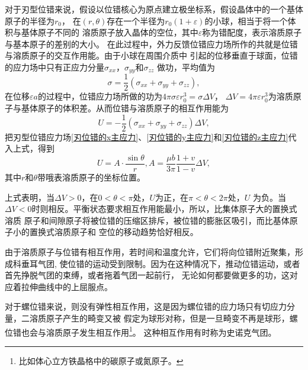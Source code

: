                     对于刃型位错来说，假设以位错核心为原点建立极坐标系，假设晶体中的一个基体原子的半径为$r_0$，
                    在$(r,\theta)$存在一个半径为$r_0(1+\varepsilon)$的小球，相当于将一个体积与基体原子不同的
                    溶质原子放入晶体的空位，其中$\varepsilon$称为错配度，表示溶质原子与基本原子的差别的大小。
                    在此过程中，外力反馈位错应力场所作的共就是位错与溶质原子的交互作用能。由于小球在周围介质中
                    引起的位移垂直于球面，位错的应力场中只有正应力分量$\sigma_{xx}$，$\sigma_{yy}$和$\sigma_{zz}$
                    做功，平均值为
                    \begin{equation}
                        \sigma=\frac{1}{2}\left( \sigma_{xx}+\sigma_{yy}+\sigma_{zz} \right),
                    \end{equation}
                    在位移$\varepsilon a$的过程中，位错应力场所做的功为$4\pi\sigma\varepsilon r_0^3=\sigma\Delta V$，
                    $\Delta V=4\pi\varepsilon r_0^3$为溶质原子与基体原子的体积差。从而位错与溶质原子的相互作用能为
                    \begin{equation}
                        U=-\frac{1}{2}\left( \sigma_{xx}+\sigma_{yy}+\sigma_{zz} \right)\Delta V,
                    \end{equation}
                    把刃型位错应力场\autoref{刃位错的x主应力}、\autoref{刃位错的y主应力}和\autoref{刃位错的z主应力}代入上式，得到
                    \begin{equation}
                        U=A\cdot\frac{\sin\theta}{r},A=\frac{\mu b}{3\pi}\frac{1+v}{1-v}\Delta V,
                    \end{equation}
                    其中$r$和$\theta$带哦表溶质原子的坐标位置。

                    上式表明，当$\Delta V>0$，在$0<\theta<\pi$处，$U$为正，在$\pi<\theta<2\pi$处，$U$
                    为负。当$\Delta V<0$时则相反。平衡状态要求相互作用能最小，所以，比集体原子大的置换式溶质
                    原子和间隙原子将被位错的压缩区排斥，被位错的膨胀区吸引，而比基体原子小的置换式溶质原子和
                    空位的移动趋势恰好相反。

                    由于溶质原子与位错有相互作用，若时间和温度允许，它们将向位错附近聚集，形成科垂耳气团,
                    使位错的运动受到限制。因为在这种情况下，推动位错运动，或者首先挣脱气团的束缚，或者拖着气团一起前行，
                    无论如何都要做更多的功，这对应着拉伸曲线中的上屈服点。

                    对于螺位错来说，则没有弹性相互作用，这是因为螺位错的应力场只有切应力分量，二溶质原子产生的畸变又被
                    假定为球形对称，但是一旦畸变不再是球形，螺位错也会与溶质原子发生相互作用\footnote{比如体心立方铁晶格中的碳原子或氮原子。}。
                    这种相互作用有时称为史诺克气团。

